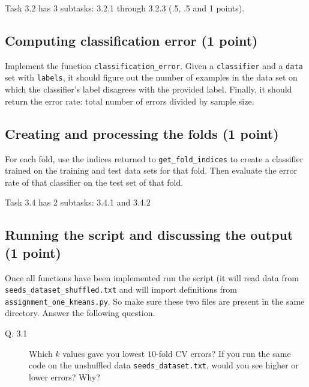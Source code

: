 \documentclass{article}
\begin{document}
Task 3.2 has 3 subtasks: 3.2.1 through 3.2.3 (.5, .5 and 1 points).

\subsection{Computing classification error (1 point)}

Implement the function {\tt classification\_error}. Given a {\tt classifier} and a {\tt data} set with {\tt labels}, it should figure out the number of examples in the data set on
which the classifier's label disagrees with the provided label. Finally, it should return the error rate: total number of errors divided by sample size.

\subsection{Creating and processing the folds (1 point)}

For each fold, use the indices returned to {\tt get\_fold\_indices} to create a classifier trained on the training and test data sets for that fold. Then
evaluate the error rate of that classifier on the test set of that fold.

Task 3.4 has 2 subtasks: 3.4.1 and 3.4.2

\subsection{Running the script and discussing the output (1 point)}

Once all functions have been implemented run the script (it will read data from {\tt seeds\_dataset\_shuffled.txt} and will import definitions from {\tt assignment\_one\_kmeans.py}. So
make sure these two files are present in the same directory. Answer the following question.

\begin{description}
\item[Q. 3.1]
Which $k$ values gave you lowest $10$-fold CV errors? If you run the same code on the unshuffled data {\tt seeds\_dataset.txt}, would you see higher or lower errors?
Why?
\end{description}
\end{document}
